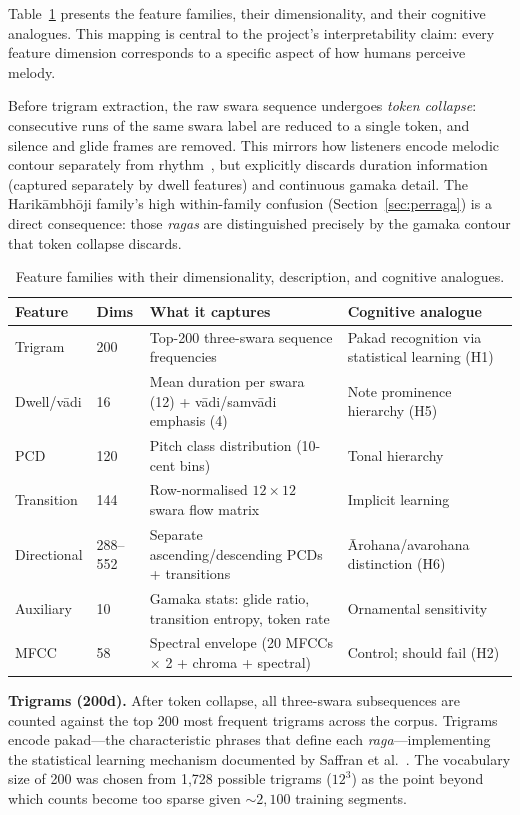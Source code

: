\documentclass[11pt,a4paper]{article}
\begin{document}
{Table~\ref{tab:features} presents the feature families, their dimensionality, and their cognitive analogues. This mapping is central to the project's interpretability claim: every feature dimension corresponds to a specific aspect of how humans perceive melody.

Before trigram extraction, the raw swara sequence undergoes \textit{token collapse}: consecutive runs of the same swara label are reduced to a single token, and silence and glide frames are removed. This mirrors how listeners encode melodic contour separately from rhythm~\cite{peretz2003}, but explicitly discards duration information (captured separately by dwell features) and continuous gamaka detail. The Harik\=ambh\=oji family's high within-family confusion (Section~\ref{sec:perraga}) is a direct consequence: those \textit{ragas} are distinguished precisely by the gamaka contour that token collapse discards.

\begin{table}[ht]
\centering
\caption{Feature families with their dimensionality, description, and cognitive analogues.}
\label{tab:features}
\small
\begin{tabularx}{\textwidth}{@{}llXX@{}}
\toprule
\textbf{Feature} & \textbf{Dims} & \textbf{What it captures} & \textbf{Cognitive analogue} \\
\midrule
Trigram & 200 & Top-200 three-swara sequence frequencies & Pakad recognition via statistical learning (H1) \\
Dwell/v\=adi & 16 & Mean duration per swara (12) + v\=adi/samv\=adi emphasis (4) & Note prominence hierarchy (H5) \\
PCD & 120 & Pitch class distribution (10-cent bins) & Tonal hierarchy~\cite{castellano1984} \\
Transition & 144 & Row-normalised $12\times12$ swara flow matrix & Implicit learning~\cite{tillmann2000} \\
Directional & 288--552 & Separate ascending/descending PCDs + transitions & \=Arohana/avarohana distinction (H6) \\
Auxiliary & 10 & Gamaka stats: glide ratio, transition entropy, token rate & Ornamental sensitivity \\
MFCC & 58 & Spectral envelope (20 MFCCs $\times$ 2 + chroma + spectral) & Control; should fail (H2) \\
\bottomrule
\end{tabularx}
\end{table}

\textbf{Trigrams (200d).} After token collapse, all three-swara subsequences are counted against the top 200 most frequent trigrams across the corpus. Trigrams encode pakad---the characteristic phrases that define each \textit{raga}---implementing the statistical learning mechanism documented by Saffran et al.~\cite{saffran1996,saffran1999}. The vocabulary size of 200 was chosen from 1,728 possible trigrams ($12^3$) as the point beyond which counts become too sparse given ${\sim}2{,}100$ training segments.

}
\end{document}
